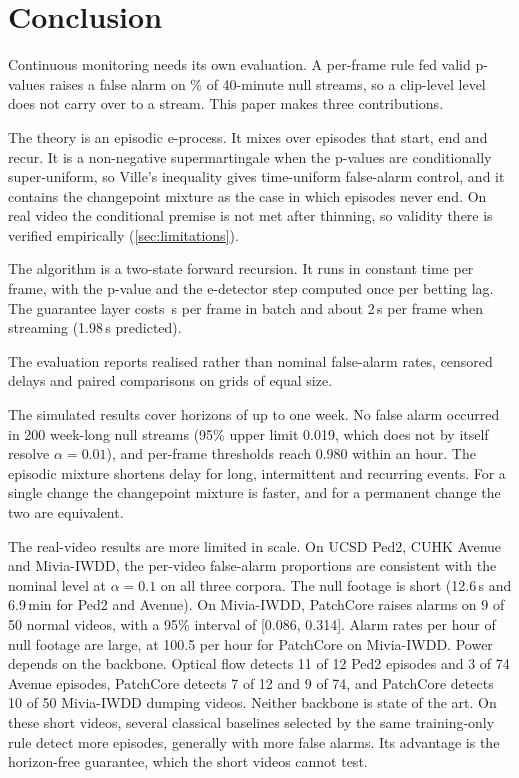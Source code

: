 \section{Conclusion}
\label{sec:conclusion}

Continuous monitoring needs its own evaluation. A per-frame rule fed valid p-values raises a false alarm on \ValidityPfaPvaluePct\% of 40-minute null streams, so a clip-level level does not carry over to a stream. This paper makes three contributions.

The theory is an episodic e-process. It mixes over episodes that start, end and recur. It is a non-negative supermartingale when the p-values are conditionally super-uniform, so Ville's inequality gives time-uniform false-alarm control, and it contains the changepoint mixture as the case in which episodes never end. On real video the conditional premise is not met after thinning, so validity there is verified empirically (\cref{sec:limitations}).

The algorithm is a two-state forward recursion. It runs in constant time per frame, with the p-value and the e-detector step computed once per betting lag. The guarantee layer costs \CostSentinelUs\,\textmu s per frame in batch and about 2\,\textmu s per frame when streaming (1.98\,\textmu s predicted).

The evaluation reports realised rather than nominal false-alarm rates, censored delays and paired comparisons on grids of equal size.

The simulated results cover horizons of up to one week. No false alarm occurred in 200 week-long null streams (95\% upper limit 0.019, which does not by itself resolve $\alpha=0.01$), and per-frame thresholds reach 0.980 within an hour. The episodic mixture shortens delay for long, intermittent and recurring events. For a single change the changepoint mixture is faster, and for a permanent change the two are equivalent.

The real-video results are more limited in scale. On UCSD Ped2, CUHK Avenue and Mivia-IWDD, the per-video false-alarm proportions are consistent with the nominal level at $\alpha=0.1$ on all three corpora. The null footage is short (12.6\,s and 6.9\,min for Ped2 and Avenue). On Mivia-IWDD, PatchCore raises alarms on 9 of 50 normal videos, with a 95\% interval of [0.086, 0.314]. Alarm rates per hour of null footage are large, at 100.5 per hour for PatchCore on Mivia-IWDD. Power depends on the backbone. Optical flow detects 11 of 12 Ped2 episodes and 3 of 74 Avenue episodes, PatchCore detects 7 of 12 and 9 of 74, and PatchCore detects 10 of 50 Mivia-IWDD dumping videos. Neither backbone is state of the art. On these short videos, several classical baselines selected by the same training-only rule detect more episodes, generally with more false alarms. Its advantage is the horizon-free guarantee, which the short videos cannot test.

